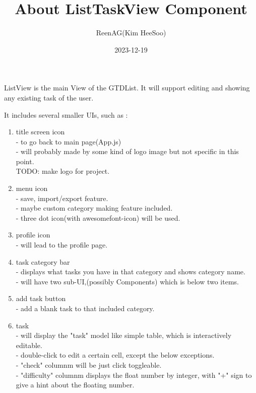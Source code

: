 \documentclass{article}
\title{About ListTaskView Component}
\date{2023-12-19}
\author{ReenAG(Kim HeeSoo)}
\begin{document}
    \maketitle
    \newpage

    ListView is the main View of the GTDList.
    It will support editing and showing any existing task of the user.

    It includes several smaller UIs, such as :
    \begin{enumerate}
        \item title screen icon\\
        - to go back to main page(App.js)\\
        - will probably made by some kind of logo image but not specific in this point.\\
        TODO: make logo for project.
        \item menu icon\\
        - save, import/export feature.\\
        - maybe custom category making feature included.\\
        - three dot icon(with awesomefont-icon) will be used.
        \item profile icon\\
        - will lead to the profile page.
        \item task category bar\\
        - displays what tasks you have in that category and shows category name.\\
        - will have two sub-UI,(possibly Components) which is below two items.
        \item add task button\\
        - add a blank task to that included category.
        \item task\\
        - will display the "task" model like simple table, which is interactively editable.\\
        - double-click to edit a certain cell, except the below exceptions.\\
        - "check" columnm will be just click toggleable.\\
        - "difficulty" columnm displays the float number by integer, with "+" sign to give a hint about the floating number.
    \end{enumerate}
\end{document}
